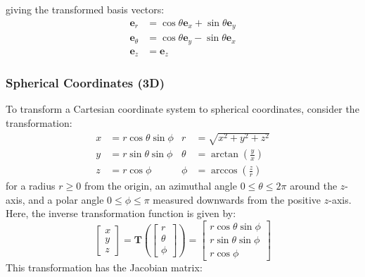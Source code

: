 \documentclass{article}
\begin{document}
giving the transformed basis vectors:
\begin{align*}
    \symbf{e}_r      & = \cos{\theta} \symbf{e}_x + \sin{\theta} \symbf{e}_y \\
    \symbf{e}_\theta & = \cos{\theta} \symbf{e}_y - \sin{\theta} \symbf{e}_x \\
    \symbf{e}_z      & = \symbf{e}_z
\end{align*}
\subsubsection{Spherical Coordinates (3D)}
To transform a Cartesian coordinate system to spherical coordinates,
consider the transformation:
\begin{align*}
    x & = r \cos{\theta} \sin{\phi} & r      & = \sqrt{x^2 + y^2 + z^2}              \\
    y & = r \sin{\theta} \sin{\phi} & \theta & = \arctan{\left( \frac{y}{x} \right)} \\
    z & = r \cos{\phi}              & \phi   & = \arccos{\left( \frac{z}{r} \right)}
\end{align*}
for a radius \(r \geqslant 0\) from the origin, an azimuthal angle
\(0 \leqslant \theta \leqslant 2\pi\) around the \(z\)-axis, and a polar
angle \(0 \leqslant \phi \leqslant \pi\) measured downwards from the
positive \(z\)-axis. Here, the inverse transformation function is given
by:
\begin{equation*}
    \begin{bmatrix}
        x \\
        y \\
        z
    \end{bmatrix}
    = \symbf{T}\left(
    \begin{bmatrix}
            r      \\
            \theta \\
            \phi
        \end{bmatrix}
    \right) =
    \begin{bmatrix}
        r \cos{\theta} \sin{\phi} \\
        r \sin{\theta} \sin{\phi} \\
        r \cos{\phi}
    \end{bmatrix}
\end{equation*}
This transformation has the Jacobian matrix:
\end{document}
